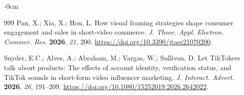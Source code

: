 \documentclass[jtaer,article,submit,moreauthors]{Definitions/mdpi}
\begin{document}
\begin{adjustwidth}{-\extralength}{0cm}
\begin{thebibliography}{999}
	Pan, X.; Xia, X.; Hou, L.
	How visual framing strategies shape consumer engagement and sales in
	short-video commerce.
	{\em J. Theor. Appl. Electron. Commer. Res.} {\bf 2026}, {\em 21}, 200.
	\url{https://doi.org/10.3390/jtaer21070200}.
	
	Snyder, E.C.; Alves, A.; Abraham, M.; Vargas, W.; Sullivan, D.
	Let TikTokers talk about products: The effects of account identity,
	verification status, and TikTok sounds in short-form video influencer
	marketing.
	{\em J. Interact. Advert.} {\bf 2026}, {\em 26}, 191--209.
	\url{https://doi.org/10.1080/15252019.2026.2642022}.
	
\end{thebibliography}

%


\PublishersNote{}
\end{adjustwidth}
\end{document}
